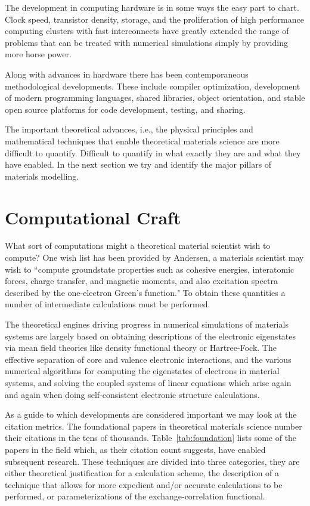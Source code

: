 The development in computing hardware is in some ways the easy part to chart. 
Clock speed, transistor density, storage, and the proliferation of high 
performance computing clusters with fast interconnects have greatly extended 
the range of problems that can be treated with numerical simulations
simply by providing more horse power.

Along with advances in hardware there has been contemporaneous methodological developments.
These include compiler optimization, development of modern programming languages, 
shared libraries, object orientation, and stable open source platforms for 
code development, testing, and sharing. 

The important theoretical advances, i.e., the physical principles and
mathematical techniques that enable theoretical materials science 
are more difficult to quantify. Difficult to quantify in what exactly 
they are and what they have enabled. In the next section 
we try and identify the major pillars of materials modelling.

\section{Computational Craft}
What sort of computations might a theoretical material scientist
wish to compute? One wish list has been provided by Andersen, a materials scientist
may wish to ``compute groundstate properties such as cohesive energies, interatomic forces, 
charge transfer, and magnetic moments, and also excitation spectra described 
by the one-electron Green's function."\cite{anderson75} To obtain these quantities a
number of intermediate calculations must be performed.

The theoretical engines driving progress in numerical simulations of materials systems are
largely based on obtaining descriptions of the electronic eigenstates via mean field theories
like density functional theory or Hartree-Fock. The effective separation
of core and valence electronic interactions, and the various numerical algorithms for 
computing the eigenstates of electrons in material systems, 
and solving the coupled systems of linear equations which arise 
again and again when doing self-consistent electronic structure calculations.

As a guide to which developments are considered important we may
look at the citation metrics. The foundational papers in theoretical materials science
number their citations in the tens of thousands. Table~\ref{tab:foundation} lists some of the papers in the field which, as
their citation count suggests, have enabled subsequent research. These techniques are divided into
three categories, they are either theoretical justification for a calculation scheme, the description of
a technique that allows for more expedient and/or accurate calculations to be performed, 
or parameterizations of the exchange-correlation functional.

